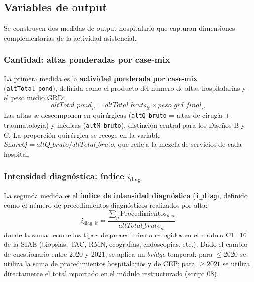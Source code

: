 \subsection{Variables de output}
\label{subsec:outputs}

Se construyen dos medidas de output hospitalario que capturan dimensiones complementarias de la actividad asistencial.

\subsubsection{Cantidad: altas ponderadas por case-mix}

La primera medida es la \textbf{actividad ponderada por case-mix} (\texttt{altTotal\_pond}), definida como el producto del número de altas hospitalarias y el peso medio GRD:
%
\begin{equation}
  \textit{altTotal\_pond}_{it} = \textit{altTotal\_bruto}_{it} \times \textit{peso\_grd\_final}_{it}
  \label{eq:alt_pond}
\end{equation}
%
Las altas se descomponen en quirúrgicas (\texttt{altQ\_bruto} = altas de cirugía + traumatología) y médicas (\texttt{altM\_bruto}), distinción central para los Diseños B y C. La proporción quirúrgica se recoge en la variable \(\textit{ShareQ} = \textit{altQ\_bruto} / \textit{altTotal\_bruto}\), que refleja la mezcla de servicios de cada hospital.

\subsubsection{Intensidad diagnóstica: índice $i_{\text{diag}}$}

La segunda medida es el \textbf{índice de intensidad diagnóstica} (\texttt{i\_diag}), definido como el número de procedimientos diagnósticos realizados por alta:
%
\begin{equation}
  i_{\text{diag},it} = \frac{\sum_p \text{Procedimientos}_{p,it}}{\textit{altTotal\_bruto}_{it}}
  \label{eq:i_diag}
\end{equation}
%
donde la suma recorre los tipos de procedimiento recogidos en el módulo C1\_16 de la SIAE (biopsias, TAC, RMN, ecografías, endoscopias, etc.). Dado el cambio de cuestionario entre 2020 y 2021, se aplica un \emph{bridge} temporal: para \(\leq 2020\) se utiliza la suma de procedimientos hospitalarios y de CEP; para \(\geq 2021\) se utiliza directamente el total reportado en el módulo restructurado (script 08).

